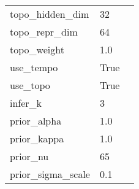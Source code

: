 \begin{table}[t!]
\begin{tabular}{lll}
                 topo\_hidden\_dim &      32 \\
                   topo\_repr\_dim &      64 \\
                     topo\_weight &     1.0 \\
                       use\_tempo &    True \\
                        use\_topo &    True \\
                         infer\_k &       3 \\
                     prior\_alpha &     1.0 \\
                     prior\_kappa &     1.0 \\
                        prior\_nu &      65 \\
                prior\_sigma\_scale &     0.1 \\
\bottomrule
\end{tabular}
\end{table}